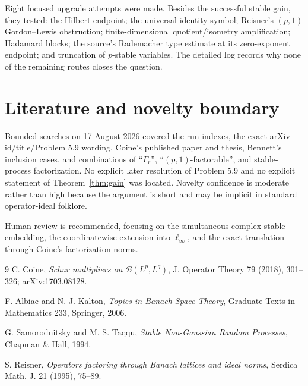\documentclass[11pt]{article}
\begin{document}
Eight focused upgrade attempts were made.  Besides the successful stable
gain, they tested: the Hilbert endpoint; the universal identity symbol;
Reisner's $(p,1)$ Gordon--Lewis obstruction; finite-dimensional
quotient/isometry amplification; Hadamard blocks; the source's Rademacher
type estimate at its zero-exponent endpoint; and truncation of $p$-stable
variables.  The detailed log records why none of the remaining routes closes
the question.

\section{Literature and novelty boundary}

Bounded searches on 17 August 2026 covered the run indexes, the exact arXiv
id/title/Problem 5.9 wording, Coine's published paper and thesis, Bennett's
inclusion cases, and combinations of ``$\Gamma_r$'', ``$(p,1)$-factorable'',
and stable-process factorization.  No explicit later resolution of Problem
5.9 and no explicit statement of Theorem~\ref{thm:gain} was located.
Novelty confidence is moderate rather than high because the argument is short
and may be implicit in standard operator-ideal folklore.

Human review is recommended, focusing on the simultaneous complex stable
embedding, the coordinatewise extension into $\ell_\infty$, and the exact
translation through Coine's factorization norms.

\sloppy
\begin{thebibliography}{9}
C. Coine,
\emph{Schur multipliers on $\mathcal B(L^p,L^q)$},
J. Operator Theory 79 (2018), 301--326; arXiv:1703.08128.

F. Albiac and N. J. Kalton,
\emph{Topics in Banach Space Theory},
Graduate Texts in Mathematics 233, Springer, 2006.

G. Samorodnitsky and M. S. Taqqu,
\emph{Stable Non-Gaussian Random Processes},
Chapman \& Hall, 1994.

S. Reisner,
\emph{Operators factoring through Banach lattices and ideal norms},
Serdica Math. J. 21 (1995), 75--89.
\end{thebibliography}
\end{document}
